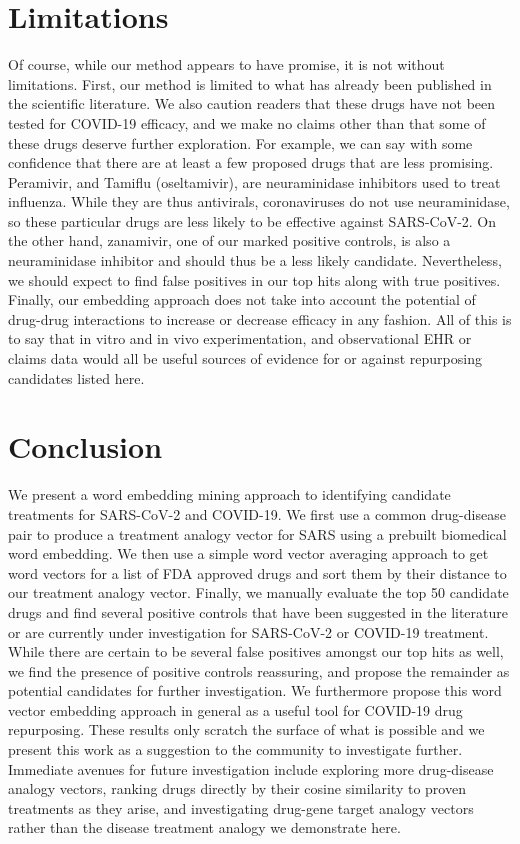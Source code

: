 \documentclass{article}
\begin{document}
\section{Limitations}

Of course, while our method appears to have promise, it is not without limitations.
First, our method is limited to what has already been published in the scientific literature.
We also caution readers that these drugs have not been tested for COVID-19 efficacy, and we make no claims other than that some of these drugs deserve further exploration.
For example, we can say with some confidence that there are at least a few proposed drugs that are less promising.
Peramivir, and Tamiflu (oseltamivir), are neuraminidase inhibitors used to treat influenza.
While they are thus antivirals, coronaviruses do not use neuraminidase, so these particular drugs are less likely to be effective against SARS-CoV-2\cite{mccreary2020coronavirus}.
On the other hand, zanamivir, one of our marked positive controls\cite{hall2020search}, is also a neuraminidase inhibitor and should thus be a less likely candidate.
Nevertheless, we should expect to find false positives in our top hits along with true positives.
Finally, our embedding approach does not take into account the potential of drug-drug interactions to increase or decrease efficacy in any fashion.
All of this is to say that in vitro and in vivo experimentation, and observational EHR or claims data would all be useful sources of evidence for or against repurposing candidates listed here.


\section{Conclusion}

We present a word embedding mining approach to identifying candidate treatments for SARS-CoV-2 and COVID-19.
We first use a common drug-disease pair to produce a treatment analogy vector for SARS using a prebuilt biomedical word embedding.
We then use a simple word vector averaging approach to get word vectors for a list of FDA approved drugs and sort them by their distance to our treatment analogy vector.
Finally, we manually evaluate the top 50 candidate drugs and find several positive controls that have been suggested in the literature or are currently under investigation for SARS-CoV-2 or COVID-19 treatment.
While there are certain to be several false positives amongst our top hits as well, we find the presence of positive controls reassuring, and propose the remainder as potential candidates for further investigation.
We furthermore propose this word vector embedding approach in general as a useful tool for COVID-19 drug repurposing.
These results only scratch the surface of what is possible and we present this work as a suggestion to the community to investigate further.
Immediate avenues for future investigation include exploring more drug-disease analogy vectors, ranking drugs directly by their cosine similarity to proven treatments as they arise, and investigating drug-gene target analogy vectors rather than the disease treatment analogy we demonstrate here.



\end{document}
